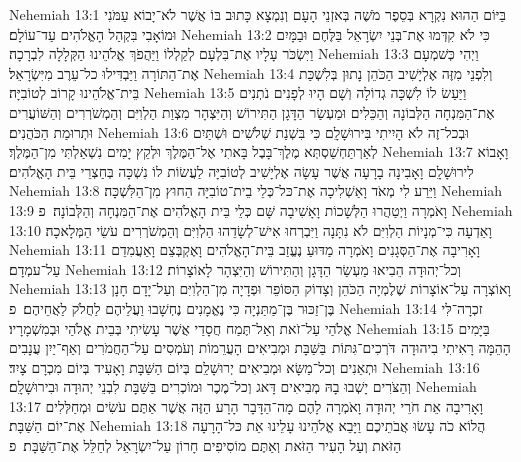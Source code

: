 Nehemiah 13:1	בַּיּוֹם הַהוּא נִקְרָא בְּסֵפֶר מֹשֶׁה בְּאזְנֵי הָעָם וְנִמְצָא כָּתוּב בּוֹ אֲשֶׁר לֹא־יָבוֹא עַמֹּנִי וּמוֹאָבִי בִּקְהַל הָאֱלֹהִים עַד־עוֹלָם׃
Nehemiah 13:2	כִּי לֹא קִדְּמוּ אֶת־בְּנֵי יִשְׂרָאֵל בַּלֶּחֶם וּבַמָּיִם וַיִּשְׂכֹּר עָלָיו אֶת־בִּלְעָם לְקַלְלוֹ וַיַּהֲפֹךְ אֱלֹהֵינוּ הַקְּלָלָה לִבְרָכָה׃
Nehemiah 13:3	וַיְהִי כְּשׁמְעָם אֶת־הַתּוֹרָה וַיַּבְדִּילוּ כל־עֵרֶב מִיִּשְׂרָאֵל׃
Nehemiah 13:4	וְלִפְנֵי מִזֶּה אֶלְיָשִׁיב הַכֹּהֵן נָתוּן בְּלִשְׁכַּת בֵּית־אֱלֹהֵינוּ קָרוֹב לְטוֹבִיָּה׃
Nehemiah 13:5	וַיַּעַשׂ לוֹ לִשְׁכָּה גְדוֹלָה וְשָׁם הָיוּ לְפָנִים נֹתְנִים אֶת־הַמִּנְחָה הַלְּבוֹנָה וְהַכֵּלִים וּמַעְשַׂר הַדָּגָן הַתִּירוֹשׁ וְהַיִּצְהָר מִצְוַת הַלְוִיִּם וְהַמְשֹׁרְרִים וְהַשּׁוֹעֲרִים וּתְרוּמַת הַכֹּהֲנִים׃
Nehemiah 13:6	וּבְכל־זֶה לֹא הָיִיתִי בִּירוּשָׁלָ͏ִם כִּי בִּשְׁנַת שְׁלֹשִׁים וּשְׁתַּיִם לְאַרְתַּחְשַׁסְתְּא מֶלֶךְ־בָּבֶל בָּאתִי אֶל־הַמֶּלֶךְ וּלְקֵץ יָמִים נִשְׁאַלְתִּי מִן־הַמֶּלֶךְ׃
Nehemiah 13:7	וָאָבוֹא לִירוּשָׁלָ͏ִם וָאָבִינָה בָרָעָה אֲשֶׁר עָשָׂה אֶלְיָשִׁיב לְטוֹבִיָּה לַעֲשׂוֹת לוֹ נִשְׁכָּה בְּחַצְרֵי בֵּית הָאֱלֹהִים׃
Nehemiah 13:8	וַיֵּרַע לִי מְאֹד וָאַשְׁלִיכָה אֶת־כּל־כְּלֵי בֵית־טוֹבִיָּה הַחוּץ מִן־הַלִּשְׁכָּה׃
Nehemiah 13:9	וָאֹמְרָה וַיְטַהֲרוּ הַלְּשָׁכוֹת וָאָשִׁיבָה שָּׁם כְּלֵי בֵּית הָאֱלֹהִים אֶת־הַמִּנְחָה וְהַלְּבוֹנָה׃ {פ}
Nehemiah 13:10	וָאֵדְעָה כִּי־מְנָיוֹת הַלְוִיִּם לֹא נִתָּנָה וַיִּבְרְחוּ אִישׁ־לְשָׂדֵהוּ הַלְוִיִּם וְהַמְשֹׁרְרִים עֹשֵׂי הַמְּלָאכָה׃
Nehemiah 13:11	וָאָרִיבָה אֶת־הַסְּגָנִים וָאֹמְרָה מַדּוּעַ נֶעֱזַב בֵּית־הָאֱלֹהִים וָאֶקְבְּצֵם וָאַעֲמִדֵם עַל־עמְדָם׃
Nehemiah 13:12	וְכל־יְהוּדָה הֵבִיאוּ מַעְשַׂר הַדָּגָן וְהַתִּירוֹשׁ וְהַיִּצְהָר לָאוֹצָרוֹת׃
Nehemiah 13:13	וָאוֹצְרָה עַל־אוֹצָרוֹת שֶׁלֶמְיָה הַכֹּהֵן וְצָדוֹק הַסּוֹפֵר וּפְדָיָה מִן־הַלְוִיִּם וְעַל־יָדָם חָנָן בֶּן־זַכּוּר בֶּן־מַתַּנְיָה כִּי נֶאֱמָנִים נֶחְשָׁבוּ וַעֲלֵיהֶם לַחֲלֹק לַאֲחֵיהֶם׃ {פ}
Nehemiah 13:14	זכְרָה־לִּי אֱלֹהַי עַל־זֹאת וְאַל־תֶּמַח חֲסָדַי אֲשֶׁר עָשִׂיתִי בְּבֵית אֱלֹהַי וּבְמִשְׁמָרָיו׃
Nehemiah 13:15	בַּיָּמִים הָהֵמָּה רָאִיתִי בִיהוּדָה  דֹּרְכִים־גִּתּוֹת  בַּשַּׁבָּת וּמְבִיאִים הָעֲרֵמוֹת וְעֹמְסִים עַל־הַחֲמֹרִים וְאַף־יַיִן עֲנָבִים וּתְאֵנִים וְכל־מַשָּׂא וּמְבִיאִים יְרוּשָׁלַ͏ִם בְּיוֹם הַשַּׁבָּת וָאָעִיד בְּיוֹם מִכְרָם צָיִד׃
Nehemiah 13:16	וְהַצֹּרִים יָשְׁבוּ בָהּ מְבִיאִים דָּאג וְכל־מֶכֶר וּמוֹכְרִים בַּשַּׁבָּת לִבְנֵי יְהוּדָה וּבִירוּשָׁלָ͏ִם׃
Nehemiah 13:17	וָאָרִיבָה אֵת חֹרֵי יְהוּדָה וָאֹמְרָה לָהֶם מָה־הַדָּבָר הָרָע הַזֶּה אֲשֶׁר אַתֶּם עֹשִׂים וּמְחַלְּלִים אֶת־יוֹם הַשַּׁבָּת׃
Nehemiah 13:18	הֲלוֹא כֹה עָשׂוּ אֲבֹתֵיכֶם וַיָּבֵא אֱלֹהֵינוּ עָלֵינוּ אֵת כּל־הָרָעָה הַזֹּאת וְעַל הָעִיר הַזֹּאת וְאַתֶּם מוֹסִיפִים חָרוֹן עַל־יִשְׂרָאֵל לְחַלֵּל אֶת־הַשַּׁבָּת׃ {פ}
